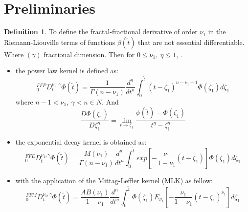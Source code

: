 \documentclass{article}
\theoremstyle{plain}
\theoremstyle{definition}
\newtheorem{definition}{Definition}[section]
\numberwithin{equation}{section}
\begin{document}
\section{Preliminaries}\label{sec3}
\begin{definition}\label{def2-1}
To define the fractal-fractional derivative of order $\nu_1$ in the Riemann-Liouville terms of functions $\beta(\tilde{t})$ that are not essential differentiable. Where $(\gamma)$ fractional dimension.
Then for $0 \leq
\nu_1,~ \eta \leq 1$, .
\begin{itemize}
    \item the power law kernel is defined as:
\begin{equation}\label{eq2-1}
    _0^{FFP}D_t^{\nu_1, \gamma}  \Phi (\tilde{t}) = \frac{1}{\Gamma (n-\nu_1)} \frac{d^n}{dt^n} \int_0^{\tilde{t}} (t-\zeta_1)^{n-\nu_1-1} \Phi (\zeta_1) d\zeta_1
\end{equation}
where $n-1 < \nu_1,~ \gamma <n \in N$. And 
\begin{equation}\label{eq2-2}
\frac{D \Phi(\zeta_1)}{D \zeta_1^{\eta}} = \lim_{t \rightarrow \zeta_1} \frac{\psi(\tilde{t}) - \Phi(\zeta_1)}{ t^{\eta} - \zeta_1^{\eta}}   
\end{equation}
\item the exponential decay kernel is obtained as:
\begin{equation}\label{eq2-3}
    _0^{FFE}D_t^{\nu_1, \gamma}  \Phi (\tilde{t}) = \frac{M (\nu_1)}{\Gamma (n-\nu_1)} \frac{d^n}{dt^n} \int_0^{\tilde{t}} exp [- \frac{\nu_1}{1-\nu_1}(t-\zeta_1)] \Phi (\zeta_1) d\zeta_1    
\end{equation}

\item with the application of the Mittag-Leffler kernel (MLK) as fellow:
\begin{equation}\label{eq2-4}
    _0^{FFM}D_t^{\nu_1, \gamma}  \Phi (\tilde{t}) = \frac{AB (\nu_1)}{1-\nu_1 } \frac{d^n}{dt^n} \int_0^{\tilde{t}} \Phi (\zeta_1) E_{\nu_1} [- \frac{\nu_1}{1-\nu_1}(t-\zeta_1)^{\nu_1}]  d\zeta_1    
\end{equation}
\end{itemize}
\end{definition}
\end{document}
